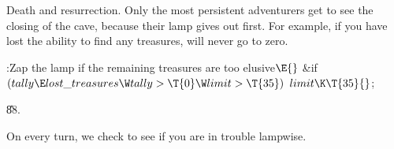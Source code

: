 Death and resurrection. Only the most persistent
adventurers get to
see the closing of the cave, because their lamp gives out first.
For example, if you have lost the ability to find any treasures,
 will never go to zero.

\Y\B\4:Zap the lamp if the remaining treasures are too elusive\X${}\E{}$\6
\&{if} ${}(\\{tally}\E\\{lost\_treasures}\W\\{tally}>\T{0}\W\\{limit}>%
\T{35}){}$\1\5
${}\\{limit}\K\T{35}{}$;\2\par
\U88.\fi

On every turn, we check to see if you are in trouble
lampwise.

